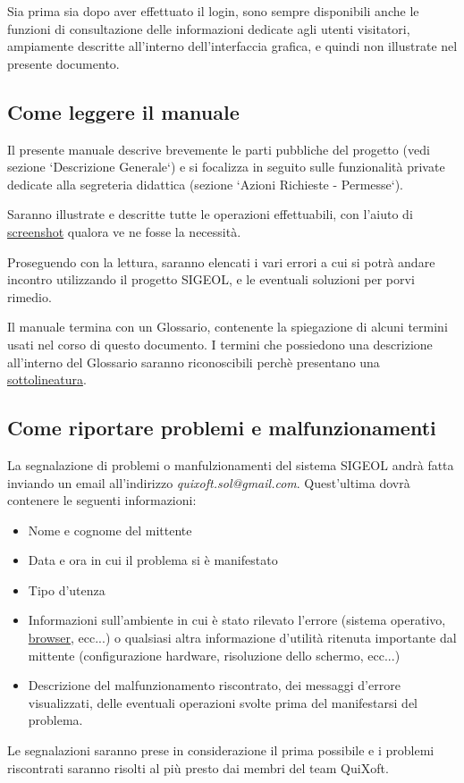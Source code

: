 \documentclass[11pt,a4paper]{article}
\begin{document}
Sia prima sia dopo aver effettuato il login, sono sempre disponibili anche le funzioni di consultazione delle informazioni dedicate agli utenti visitatori, ampiamente descritte all'interno dell'interfaccia grafica, e quindi non illustrate nel presente documento.
\subsection{Come leggere il manuale}
Il presente manuale descrive brevemente le parti pubbliche del progetto (vedi sezione `Descrizione Generale`) e si focalizza in seguito sulle funzionalità private dedicate alla segreteria didattica (sezione `Azioni Richieste - Permesse`).

Saranno illustrate e descritte tutte le operazioni effettuabili, con l'aiuto di \underline{screenshot} qualora ve ne fosse la necessità.

Proseguendo con la lettura, saranno elencati i vari errori a cui si potrà andare incontro utilizzando il progetto SIGEOL, e le eventuali soluzioni per porvi rimedio.

Il manuale termina con un Glossario, contenente la spiegazione di alcuni termini usati nel corso di questo documento.
I termini che possiedono una descrizione all'interno del Glossario saranno riconoscibili perchè presentano una \underline{sottolineatura}.

\subsection{Come riportare problemi e malfunzionamenti}
La segnalazione di problemi o manfulzionamenti del sistema SIGEOL andrà fatta inviando un email all'indirizzo \textit{quixoft.sol@gmail.com}.
Quest'ultima dovrà contenere le seguenti informazioni:
\begin{itemize}
 \item Nome e cognome del mittente
 \item Data e ora in cui il problema si è manifestato
 \item Tipo d'utenza
 \item Informazioni sull'ambiente in cui è stato rilevato l'errore (sistema operativo, \underline{browser}, ecc...) o qualsiasi altra informazione d'utilità ritenuta importante dal mittente (configurazione hardware, risoluzione dello schermo, ecc...)
 \item Descrizione del malfunzionamento riscontrato, dei messaggi d'errore visualizzati, delle eventuali operazioni svolte prima del manifestarsi del problema.
\end{itemize}
Le segnalazioni saranno prese in considerazione il prima possibile e i problemi riscontrati saranno risolti al più presto dai membri del team QuiXoft.
\end{document}
